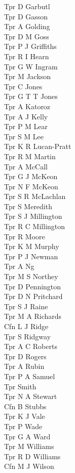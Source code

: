 \begin{multicols}{2}
  Tpr D Garbutl \\
  Tpr D Gasson \\
  Tpr A Golding \\
  Tpr D M Goss \\
  Tpr P J Griffiths \\
  Tpr R I Hearn \\
  Tpr G W Ingram \\
  Tpr M Jackson \\
  Tpr C Jones \\
  Tpr G T T Jones \\
  Tpr A Katoroz \\
  Tpr A J Kelly \\
  Tpr P M Lear \\
  Tpr S M Lee \\
  Tpr K R Lucan-Pratt \\
  Tpr R M Martin \\
  Tpr A McCall \\
  Tpr G J McKeon \\
  Tpr N F McKeon \\
  Tpr S R McLachlan \\
  Tpr S Meredith \\
  Tpr S J Millington \\
  Tpr R C Millington \\
  Tpr R Moore \\
  Tpr K M Murphy \\
  Tpr P J Newman \\
  Tpr A Ng \\
  Tpr M S Northey \\
  Tpr D Pennington \\
  Tpr D N Pritchard \\
  Tpr S J Raine \\
  Tpr M A Richards \\
  Cfn L J Ridge \\
  Tpr S Ridgway \\
  Tpr A C Roberts \\
  Tpr D Rogers \\
  Tpr A Rubin \\
  Tpr P A Samuel \\
  Tpr Smith \\
  Tpr N A Stewart \\
  Cfn B Stubbs \\
  Tpr K J Vale \\
  Tpr P Wade \\
  Tpr G A Ward \\
  Tpr M Williams \\
  Tpr R D Williams \\
  Cfn M J Wilson \\
\end{multicols}

